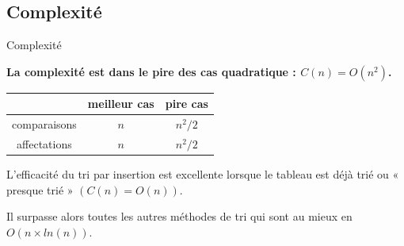 \subsection{Complexité}

\begin{prop}{Complexité}
%
%
%


\textbf{La complexité est dans le pire des cas quadratique : $C(n)=O(n^2)$.}


\begin{center}
\begin{tabular}{|c|c|c|}
\hline 
\rule[-1ex]{0pt}{2.5ex}  & meilleur cas &  pire cas \\ 
\hline 
\rule[-1ex]{0pt}{2.5ex} comparaisons & $n$ & $n^2/2$ \\ 
\hline 
\rule[-1ex]{0pt}{2.5ex} affectations & $n$ & $n^2/2$ \\ 
\hline 
\end{tabular} 
\end{center}



L'efficacité du tri par insertion est excellente lorsque le tableau est déjà trié ou « presque trié » $(C(n)=O(n))$. 

Il surpasse alors toutes les autres méthodes de tri qui sont au mieux en $O(n \times ln(n))$.
\end{prop}

